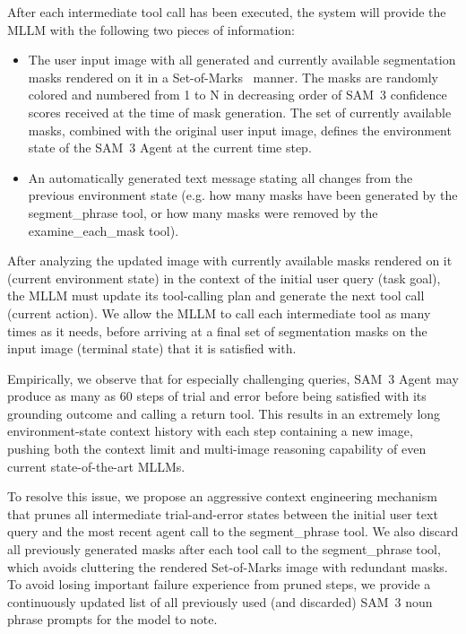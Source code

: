 \documentclass[]{fairmeta}
\newcommand{\model}{SAM~3\xspace}
\begin{document}
\vspace{1.5em}
After each intermediate tool call has been executed, the system will provide the MLLM with the following two pieces of information:
\begin{itemize}
	\item The user input image with all generated and currently available segmentation masks rendered on it in a Set-of-Marks~\citep{yang2023setofmark} manner. The masks are randomly colored and numbered from 1 to N in decreasing order of \model confidence scores received at the time of mask generation. The set of currently available masks, combined with the original user input image, defines the environment state of the \model Agent at the current time step.
	\item An automatically generated text message stating all changes from the previous environment state (e.g. how many masks have been generated by the segment\_phrase tool, or how many masks were removed by the examine\_each\_mask tool).
\end{itemize}
After analyzing the updated image with currently available masks rendered on it (current environment state) in the context of the initial user query (task goal), the MLLM must update its tool-calling plan and generate the next tool call (current action). We allow the MLLM to call each intermediate tool as many times as it needs, before arriving at a final set of segmentation masks on the input image (terminal state) that it is satisfied with. 

Empirically, we observe that for especially challenging queries, \model Agent may produce as many as 60 steps of trial and error before being satisfied with its grounding outcome and calling a return tool. This results in an extremely long environment-state context history with each step containing a new image, pushing both the context limit and multi-image reasoning capability of even current state-of-the-art MLLMs.

To resolve this issue, we propose an aggressive context engineering mechanism that prunes all intermediate trial-and-error states between the initial user text query and the most recent agent call to the segment\_phrase tool. We also discard all previously generated masks after each tool call to the segment\_phrase tool, which avoids cluttering the rendered Set-of-Marks image with redundant masks. To avoid losing important failure experience from pruned steps, we provide a continuously updated list of all previously used (and discarded) \model noun phrase prompts for the model to note. 
\end{document}
